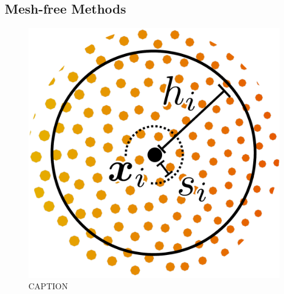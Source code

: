 

\subsection{Mesh-free Methods}

\cite{monaghan1992SmoothedParticleHydrodynamics, vacondio2021GrandChallengesSmoothed}


\begin{figure}[t]
\centering
\includegraphics[scale=0.175]{assets/imgs/labfm-stencil-drawn_simple.pdf}
\caption{CAPTION}
\label{fig:labfm-stencil}
\end{figure}
        




